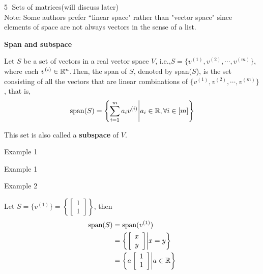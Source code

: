 \textcircled{5} Sets of matrices(will discuss later)\\
\vspace{0.3cm}
Note: Some authors prefer “linear space" rather than "vector space" since elements of space are not always vectors in the sense of a list.

\vspace{0.5cm}

\textbf{Span and subspace}

Let $S$ be a set of vectors in a real vector space $V$, i.e.,$S=\{v^{(1)}, v^{(2)}, \cdots ,v^{(m)}\}$, where each $v^{(i)}\in \mathbb{R}^{n}$.Then, the span of $S$, denoted by span($S$), is the set consisting of all the vectors that are linear combinations of $\{v^{(1)}, v^{(2)}, \cdots ,v^{(m)}\}$, that is, 
$$\text{span}(S)=\left\{\sum_{i=1}^{m} a_{i}v^{(i)}\middle| a_{i}\in \mathbb{R} ,\forall i\in [m]\right\}$$

This set is also called a \textbf{subspace} of $V$.

\vspace{0.3cm}
Example 1

\begin{marginfigure}
	\centering
	\resizebox{7.5cm}{3cm}{}
	\caption{Example 1}
	\label{fig.2-3}
\end{marginfigure}

\begin{marginfigure}
	\centering
	\resizebox{7.5cm}{3cm}{}
	\caption{Example 2}
	\label{fig.2-4}
\end{marginfigure}

Let $S=\{v^{(1)}\}=\left\{ 
\left[ 
\begin{array}{c} 
1 \\
1
\end{array}
\right]\right\}$, then
\begin{align*}
\text{span}(S)&=\text{span}({v^{(1)}})\\
&=\left\{\left[ 
	\begin{array}{c} 
	x \\
	y
	\end{array}
	\right]\middle|x=y\right\}\\
&=\left\{a\left[ 
	\begin{array}{c} 
	1 \\
	1
	\end{array}
	\right]\middle|a\in\mathbb{R}\right\}
\end{align*}\\

